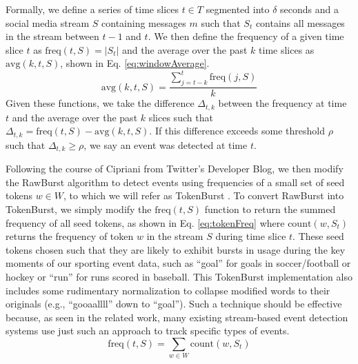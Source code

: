 \documentclass[letterpaper]{article}
\begin{document}
Formally, we define a series of time slices $t \in T$ segmented into $\delta$ seconds and a social media stream $S$ containing messages $m$ such that $S_t$ contains all messages in the stream between $t-1$ and $t$.
We then define the frequency of a given time slice $t$ as $\text{freq}(t, S) = |S_t|$ and the average over the past $k$ time slices as $\text{avg}(k, t, S)$, shown in Eq. \ref{eq:windowAverage}.
%
\begin{equation}
\label{eq:windowAverage}
\text{avg}(k, t, S) = \frac{\sum_{j=t-k}^{t}\text{freq}(j, S)}{k}
\end{equation}
%
Given these functions, we take the difference $\Delta_{t, k}$ between the frequency at time $t$ and the average over the past $k$ slices such that $\Delta_{t, k} = \text{freq}(t, S) - \text{avg}(k, t, S)$.
If this difference exceeds some threshold $\rho$ such that $\Delta_{t, k} \ge \rho$, we say an event was detected at time $t$.

Following the course of Cipriani from Twitter's Developer Blog, we then modify the RawBurst algorithm to detect events using frequencies of a small set of seed tokens $w \in W$, to which we will refer as TokenBurst  \cite{Cipriani2014}. 
To convert RawBurst into TokenBurst, we simply modify the $\text{freq}(t, S)$ function to return the summed frequency of all seed tokens, as shown in Eq. \ref{eq:tokenFreq} where $\text{count}(w, S_t)$ returns the frequency of token $w$ in the stream $S$ during time slice $t$. 
These seed tokens chosen such that they are likely to exhibit bursts in usage during the key moments of our sporting event data, such as ``goal'' for goals in soccer/football or hockey or ``run'' for runs scored in baseball.
This TokenBurst implementation also includes some rudimentary normalization to collapse modified words to their originals (e.g., ``gooaallll'' down to ``goal'').
Such a technique should be effective because, as seen in the related work, many existing stream-based event detection systems use just such an approach to track specific types of events.
%
\begin{equation}
\label{eq:tokenFreq}
\text{freq}(t, S) = \sum_{w \in W}\text{count}(w, S_t)
\end{equation}
\end{document}

